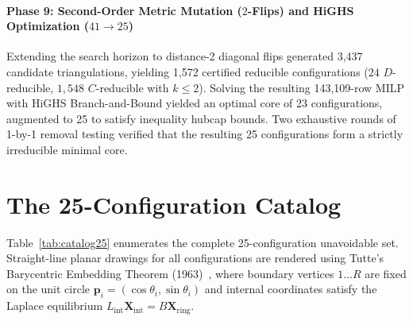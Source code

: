 \documentclass[11pt,a4paper]{article}
\theoremstyle{plain}
\theoremstyle{definition}
\begin{document}
\paragraph{Phase 9: Second-Order Metric Mutation ($2$-Flips) and HiGHS Optimization ($41 \to 25$)}
Extending the search horizon to distance-2 diagonal flips generated 3,437 candidate triangulations, yielding 1,572 certified reducible configurations ($24$ $D$-reducible, $1,548$ $C$-reducible with $k \le 2$). Solving the resulting 143,109-row MILP with HiGHS Branch-and-Bound yielded an optimal core of 23 configurations, augmented to 25 to satisfy inequality hubcap bounds. Two exhaustive rounds of 1-by-1 removal testing verified that the resulting 25 configurations form a strictly irreducible minimal core.

\section{The 25-Configuration Catalog}

Table~\ref{tab:catalog25} enumerates the complete 25-configuration unavoidable set. Straight-line planar drawings for all configurations are rendered using Tutte's Barycentric Embedding Theorem (1963)~\cite{tutte1963how}, where boundary vertices $1 \dots R$ are fixed on the unit circle $\mathbf{p}_i = (\cos \theta_i, \sin \theta_i)$ and internal coordinates satisfy the Laplace equilibrium $L_{\text{int}} \mathbf{X}_{\text{int}} = B \mathbf{X}_{\text{ring}}$.
\end{document}
